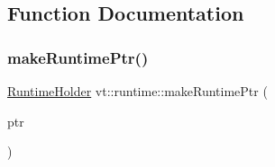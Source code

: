 \subsection{Function Documentation}
\mbox{\label{namespacevt_1_1runtime_a71998fecf2a4d70b11e3ae4aa47810db}} 
\subsubsection{\texorpdfstring{make\+Runtime\+Ptr()}{makeRuntimePtr()}}
{\footnotesize\ttfamily \hyperlink{structvt_1_1runtime_1_1_runtime_holder}{Runtime\+Holder} vt\+::runtime\+::make\+Runtime\+Ptr (\begin{DoxyParamCaption}\item[{\hyperlink{structvt_1_1runtime_1_1_runtime_holder_a9740e8aa7487fcf38b67a7e160d7b046}{Runtime\+Holder\+::\+Pointer\+Type} const}]{ptr }\end{DoxyParamCaption})\hspace{0.3cm}{\ttfamily [inline]}}

